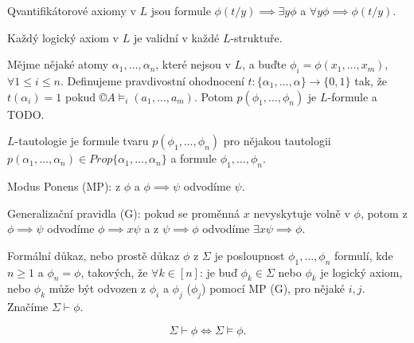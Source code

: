\documentclass[12pt]{article}                   %
\begin{document}

        \begin{definice}
            Qvantifikátorové axiomy v $L$ jsou formule $\phi(t/y) \implies \exists y\phi$ a $\forall y \phi \implies \phi(t/y)$.
        \end{definice}

        \begin{veta}
            Každý logický axiom v $L$ je validní v každé $L$-struktuře.

            \begin{lemmain}
                Mějme nějaké atomy $\alpha_1, …, \alpha_n$, které nejsou v $L$, a buďte $\phi_i = \phi(x_1, …, x_m)$, $\forall 1 ≤ i ≤ n$. Definujeme pravdivostní ohodnocení $t:\{\alpha_1, …, \alpha\} \rightarrow \{0, 1\}$ tak, že $t(\alpha_i) = 1$ pokud $©A \models_i(a_1, …, a_m)$. Potom $p(\phi_1, …, \phi_n)$ je $L$-formule a TODO.
            \end{lemmain}

            \begin{definicein}[$L$-tautologie]
                $L$-tautologie je formule tvaru $p(\phi_1, …, \phi_n)$ pro nějakou tautologii $p(\alpha_1, …, \alpha_n) \in Prop\{\alpha_1, …, \alpha_n\}$ a formule $\phi_1, …, \phi_n$.
            \end{definicein}
        \end{veta}

        \begin{definice}
            Modus Ponens (MP): z $\phi$ a $\phi \implies \psi$ odvodíme $\psi$.

            Generalizační pravidla (G): pokud se proměnná $x$ nevyskytuje volně v $\phi$, potom z $\phi \implies \psi$ odvodíme $\phi \implies x\psi$ a z $\psi \implies \phi$ odvodíme $\exists x \psi \implies \phi$.
        \end{definice}

        \begin{definice}[Důkaz]
            Formální důkaz, nebo prostě důkaz $\phi$ z $\Sigma$ je posloupnost $\phi_1, …, \phi_n$ formulí, kde $n ≥ 1$ a $\phi_n = \phi$, takových, že $\forall k \in [n]$: je buď $\phi_k \in \Sigma$ nebo $\phi_k$ je logický axiom, nebo $\phi_k$ může být odvozen z $\phi_i$ a $\phi_j$ ($\phi_j$) pomocí MP (G), pro nějaké $i, j$. Značíme $\Sigma \vdash \phi$.
        \end{definice}

        \begin{veta}
            $$ \Sigma \vdash \phi \Leftrightarrow \Sigma \models \phi. $$ 
        \end{veta}
\end{document}
